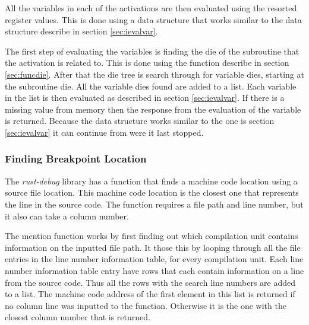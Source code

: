 All the variables in each of the activations are then evaluated using the resorted register values.
This is done using a data structure that works similar to the data structure describe in section \ref{sec:ievalvar}.

The first step of evaluating the variables is finding the \gls{die} of the subroutine that the activation is related to.
This is done using the function describe in section \ref{sec:funcdie}.
After that the \gls{die} tree is search through for variable \glspl{die}, starting at the subroutine \gls{die}.
All the variable \glspl{die} found are added to a list.
Each variable in the list is then evaluated as described in section \ref{sec:ievalvar}.
If there is a missing value from memory then the response from the evaluation of the variable is returned.
Because the data structure works similar to the one is section \ref{sec:ievalvar} it can continue from were it last stopped.


\subsubsection{Finding Breakpoint Location}
The \emph{rust-debug} library has a function that finds a machine code location using a source file location.
This machine code location is the closest one that represents the line in the source code.
The function requires a file path and line number, but it also can take a column number.


The mention function works by first finding out which compilation unit contains information on the inputted file path.
It those this by looping through all the file entries in the line number information table, for every compilation unit.
Each line number information table entry have rows that each contain information on a line from the source code.
Thus all the rows with the search line numbers are added to a list.
The machine code address of the first element in this list is returned if no column line was inputted to the function.
Otherwise it is the one with the closest column number that is returned.


